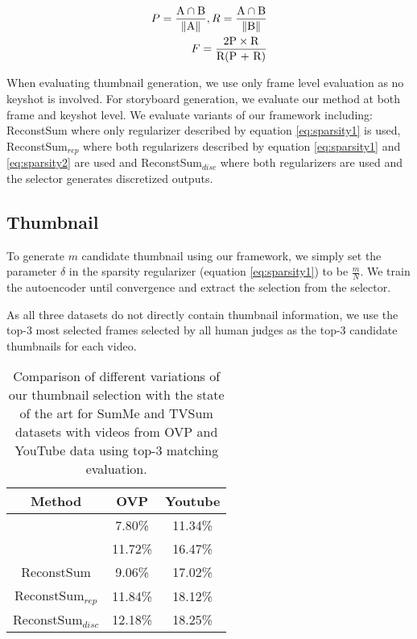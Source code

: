 \documentclass[5pt]{article}
\newcommand{\norm}[1]{\left\lVert#1\right\rVert}
\begin{document}
\begin{eqnarray}
P = \frac{\textnormal{A} \cap \textnormal{B}}{\norm{\textnormal{A}}}, R = \frac{\textnormal{A} \cap \textnormal{B}}{\norm{\textnormal{B}}} \\
F = \frac{\textnormal{2P} \times \textnormal{R}}{\textnormal{R(P + R)}}
\label{eq:PR}
\end{eqnarray}

When evaluating thumbnail generation, we use only frame level evaluation as no keyshot is involved. For storyboard generation, we evaluate our method at both frame and keyshot level. We evaluate variants of our framework including: ReconstSum where only regularizer described by equation \ref{eq:sparsity1} is used, ReconstSum$_{rep}$ where both regularizers described by equation \ref{eq:sparsity1} and  \ref{eq:sparsity2} are used and ReconstSum$_{disc}$ where both regularizers are used and the selector generates discretized outputs.

\subsection{Thumbnail}
To generate $m$ candidate thumbnail using our framework, we simply set the parameter $\delta$ in the sparsity regularizer (equation \ref{eq:sparsity1}) to be $\frac{m}{N}$. We train the autoencoder until convergence and extract the selection from the selector.

As all three datasets do not directly contain thumbnail information, we use the top-3 most selected frames selected by all human judges as the top-3 candidate thumbnails for each video. 

\begin{table}[t]
\begin{center}
\caption{Comparison of different variations of our thumbnail selection with the state of the art for SumMe and TVSum datasets with videos from OVP and YouTube data using top-3 matching evaluation.} \label{tab:cap}
\begin{tabular}{|c|c|c|}
  \hline
  Method & OVP & Youtube
  \\
  \hline
  \cite{mahasseni2017unsupervised}\footnotemark &  7.80\% & 11.34\%   \\
  \cite{song2016click} &  11.72\% &  16.47\%\\
  ReconstSum &  9.06\% &  17.02\%\\
  ReconstSum$_{rep}$ &  11.84\% &  18.12\%\\
  ReconstSum$_{disc}$ &  12.18\% &  18.25\%\\
  \hline
\end{tabular}
\label{tb:top3}
\end{center}
\end{table}
\end{document}
